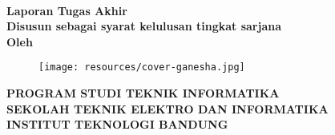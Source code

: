 \clearpage
\pagestyle{empty}


{\selectfont%
    \begin{center}

        \smallskip

        \large{\bfseries \MakeUppercase{\thetitle}}
        \\[2\baselineskip]

        \large{\bfseries Laporan Tugas Akhir}
        \\[\baselineskip]

        \normalsize{ \bfseries
            Disusun sebagai syarat kelulusan tingkat sarjana
        }
        \\[3\baselineskip]

        \normalsize{ \bfseries Oleh\\}
        \large{ \bfseries \MakeUppercase{\theauthor}}

        \vfill
        \begin{figure}[h]
            \centering
            \texttt{[image: resources/cover-ganesha.jpg]}
        \end{figure}
        \vfill

        \large{ \bfseries
            \uppercase{
                Program Studi Teknik Informatika \\
                Sekolah Teknik Elektro dan Informatika \\
                Institut Teknologi Bandung\\
            }
            \thismonth
        }

    \end{center}
}%

\restoregeometry
\clearpage
